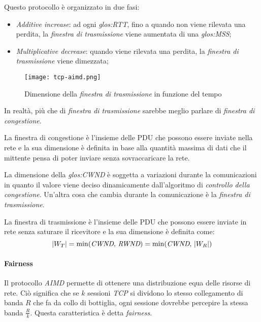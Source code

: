 \bigskip\noindent
Questo protocollo è organizzato in due fasi:
\begin{itemize}
    \item \emph{Additive increase}: ad ogni \emph{\gls{glos:RTT}}, fino a quando
    non viene rilevata una perdita, la \emph{finestra di trasmissione} viene
    aumentata di una \emph{\gls{glos:MSS}};
    \item \emph{Multiplicative decrease}: quando viene rilevata una perdita, la
    \emph{finestra di trasmissione} viene dimezzata;
\end{itemize}

\begin{figure}[h!]
    \centering
    \texttt{[image: tcp-aimd.png]}
    \caption{Dimensione della \emph{finestra di trasmissione} in funzione del tempo}
\end{figure}

\begin{note}
    In realtà, più che di \emph{finestra di trasmissione} sarebbe meglio parlare
    di \emph{finestra di congestione}.
\end{note}
\begin{definition}
    La finestra di congestione è l'insieme delle PDU che possono essere
    inviate nella rete e la sua dimensione è definita in base alla quantità
    massima di dati che il mittente pensa di poter inviare senza sovraccaricare
    la rete.
\end{definition}\noindent
La dimensione della \emph{\gls{glos:CWND}} è soggetta a variazioni durante la
comunicazioni in quanto il valore viene deciso dinamicamente dall'algoritmo di
\emph{controllo della congestione}. Un'altra cosa che cambia durante la
comunicazione è la \emph{finestra di trasmissione}.

\begin{definition}
    La finestra di trasmissione è l'insieme delle PDU che possono essere inviate
    in rete senza saturare il ricevitore e la sua dimensione è definita come:
    \[|W_T|=\min(\emph{CWND},\,\emph{RWND})=\min(\emph{CWND},\,|W_R|)\]
\end{definition}

\paragraph{Fairness}
Il protocollo \emph{AIMD} permette di ottenere una distribuzione equa delle
risorse di rete. Ciò significa che se $k$ sessioni \emph{TCP} si dividono lo
stesso collegamento di banda $R$ che fa da collo di bottiglia, ogni sessione
dovrebbe percepire la stessa banda $\frac{R}{k}$. Questa caratteristica è
detta \emph{fairness}.

